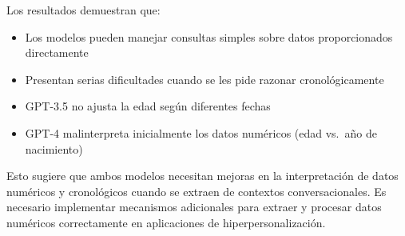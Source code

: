 Los resultados demuestran que:

\begin{itemize}
    \item Los modelos pueden manejar consultas simples sobre datos proporcionados directamente
    \item Presentan serias dificultades cuando se les pide razonar cronológicamente
    \item GPT-3.5 no ajusta la edad según diferentes fechas
    \item GPT-4 malinterpreta inicialmente los datos numéricos (edad vs.\ año de nacimiento)
\end{itemize}

Esto sugiere que ambos modelos necesitan mejoras en la interpretación de datos numéricos y cronológicos cuando se extraen de contextos conversacionales. Es necesario implementar mecanismos adicionales para extraer y procesar datos numéricos correctamente en aplicaciones de hiperpersonalización. 